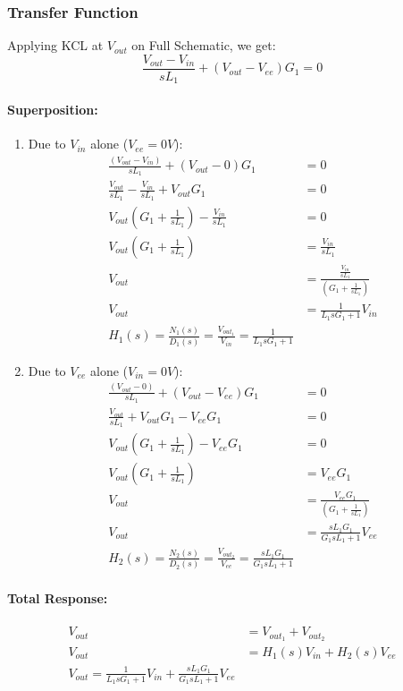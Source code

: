 \subsubsection{Transfer Function}
Applying KCL at $V_{out}$ on Full Schematic, we get:
\[
  \frac{V_{out} - V_{in}}{sL_1} + (V_{out} - V_{ee}){G_1} = 0
\]
\paragraph{Superposition:}
\begin{enumerate}
  \item Due to \(V_{in}\) alone (\(V_{ee} = 0V\)):
    \begin{align*}
      \frac{(V_{out} - V_{in})}{sL_1} + (V_{out} - 0){G_1} &= 0 \\
      \frac{V_{out}}{sL_1} - \frac{V_{in}}{sL_1} + V_{out}G_1 &= 0 \\
      V_{out}(G_1 + \frac{1}{sL_1}) - \frac{V_{in}}{sL_1} &= 0 \\
      V_{out}(G_1 + \frac{1}{sL_1}) &= \frac{V_{in}}{sL_1} \\
      V_{out} &= \frac{\frac{V_{in}}{sL_1}}{(G_1 + \frac{1}{sL_1})} \\
      V_{out} &= \frac{1}{L_1 s G_1 + 1}V_{in} \\
      \boxed{H_1(s) = \frac{N_1(s)}{D_1(s)} = \frac{V_{out_1}}{V_{in}} = \frac{1}{L_1 s G_1 + 1}}
    \end{align*}
  \item Due to \(V_{ee}\) alone (\(V_{in} = 0V\)):
    \begin{align*}
      \frac{(V_{out} - 0)}{sL_1} + (V_{out} - V_{ee}){G_1} &= 0 \\
      \frac{V_{out}}{sL_1} + V_{out}G_1 - V_{ee}G_1 &= 0 \\
      V_{out}(G_1 + \frac{1}{sL_1}) - V_{ee}G_1 &= 0 \\
      V_{out}(G_1 + \frac{1}{sL_1}) &= V_{ee}G_1 \\
      V_{out} &= \frac{V_{ee}G_1}{(G_1 + \frac{1}{sL_1})} \\
      V_{out} &= \frac{sL_1 G_1}{G_1 s L_1 + 1}V_{ee} \\
      \boxed{H_2(s) = \frac{N_2(s)}{D_2(s)} = \frac{V_{out_2}}{V_{ee}} = \frac{sL_1 G_1}{G_1 s L_1 + 1}}
    \end{align*}
\end{enumerate}
\paragraph{Total Response:}
\begin{align*}
  V_{out} &= V_{out_1} + V_{out_2} \\
  V_{out} &= H_1(s) V_{in} + H_2(s) V_{ee} \\
  \boxed{V_{out} = \frac{1}{L_1 s G_1 + 1} V_{in} + \frac{sL_1 G_1}{G_1 s L_1 + 1} V_{ee}}
\end{align*}


